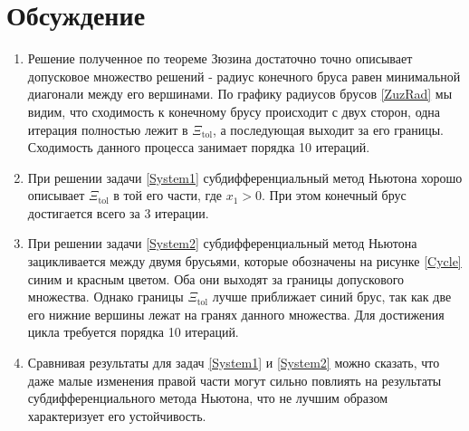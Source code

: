 \section{Обсуждение}
\begin{enumerate}
    \item Решение полученное по теореме Зюзина достаточно точно описывает допусковое множество решений - радиус конечного бруса равен минимальной диагонали между его вершинами. По графику радиусов брусов \eqref{ZuzRad} мы видим, что сходимость к конечному брусу происходит с двух сторон, одна итерация полностью лежит в $\Xi_{\mathrm{tol}}$, а последующая выходит за его границы. Сходимость данного процесса занимает порядка 10 итераций.
    \item При решении задачи \eqref{System1} субдифференциальный метод Ньютона хорошо описывает $\Xi_{\mathrm{tol}}$ в той его части, где $x_1>0$. При этом конечный брус достигается всего за 3 итерации.
    \item При решении задачи \eqref{System2} субдифференциальный метод Ньютона зацикливается между двумя брусьями, которые обозначены на рисунке \eqref{Cycle} синим и красным цветом. Оба они выходят за границы допускового множества. Однако границы $\Xi_{\mathrm{tol}}$ лучше приближает синий брус, так как две его нижние вершины лежат на гранях данного множества. Для достижения цикла требуется порядка 10 итераций.
    \item Сравнивая результаты для задач \eqref{System1} и \eqref{System2} можно сказать, что даже малые изменения правой части могут сильно повлиять на результаты  субдифференциального метода Ньютона, что не лучшим образом характеризует его устойчивость.
\end{enumerate}